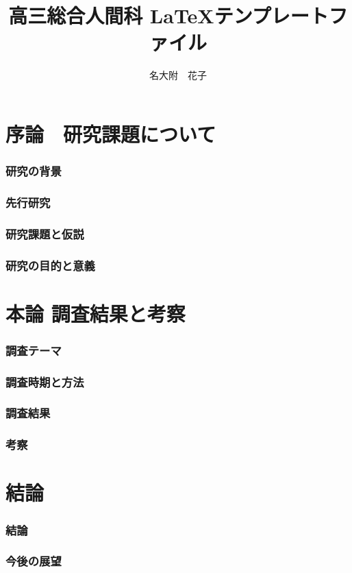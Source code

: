 \documentclass[10.5pt]{jsarticle}
\title{
高三総合人間科 \LaTeX テンプレートファイル}
\author{
名大附　花子}
\date{}
\begin{document}
\maketitle
\begin{abstract}

\end{abstract}


\part{序論　研究課題について}
\section{研究の背景}

\section{先行研究}

\section{研究課題と仮説}

\section{研究の目的と意義}

\part{本論 調査結果と考察}
\section{調査テーマ}

\section{調査時期と方法}

\section{調査結果}

\section{考察}

\part{結論}
\section{結論}

\section{今後の展望}
\begin{thebibliography}{2501}

\end{thebibliography}
\end{document}
